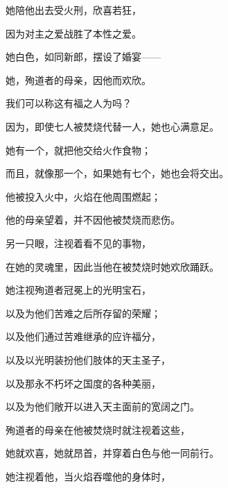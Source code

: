 她陪他出去受火刑，欣喜若狂，\par

因为对主之爱战胜了本性之爱。\par

她白色，如同新郎，摆设了婚宴——\par

她，殉道者的母亲，因他而欢欣。\par

我们可以称这有福之人为吗？\par

因为，即使七人被焚烧代替一人，她也心满意足。\par

她有一个，就把他交给火作食物；\par

而且，就像那一个，如果她有七个，她也会将交出。\par

他被投入火中，火焰在他周围燃起；\par

他的母亲望着，并不因他被焚烧而悲伤。\par

另一只眼，注视着看不见的事物，\par

在她的灵魂里，因此当他在被焚烧时她欢欣踊跃。\par

她注视殉道者冠冕上的光明宝石，\par

以及为他们苦难之后所存留的荣耀；\par

以及他们通过苦难继承的应许福分，\par

以及以光明装扮他们肢体的天主圣子，\par

以及那永不朽坏之国度的各种美丽，\par

以及为他们敞开以进入天主面前的宽阔之门。\par

殉道者的母亲在他被焚烧时就注视着这些，\par

她就欢喜，她就昂首，并穿着白色与他一同前行。\par

她注视着他，当火焰吞噬他的身体时，\par

